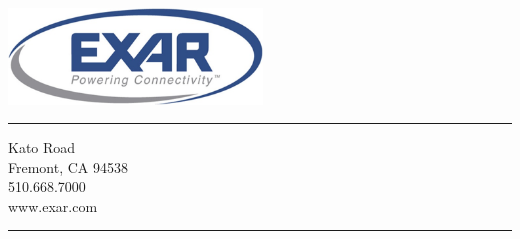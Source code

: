 \clearpage
\thispagestyle{empty}

\includegraphics[width=6.75cm]{exar_logo.jpg}\\
{\color{gray}\rule{\textwidth}{1pt}}

{ Kato Road\\
  Fremont, CA 94538\\
  510.668.7000\\
  www.exar.com\\

}

{\color{gray}
  \rule{\textwidth}{1pt}\\}
\begin{flushright}
\color{ThemeColor}\bfseries\fontsize{22}{22}\selectfont{Exar Confidential}
\end{flushright}
\pagebreak



